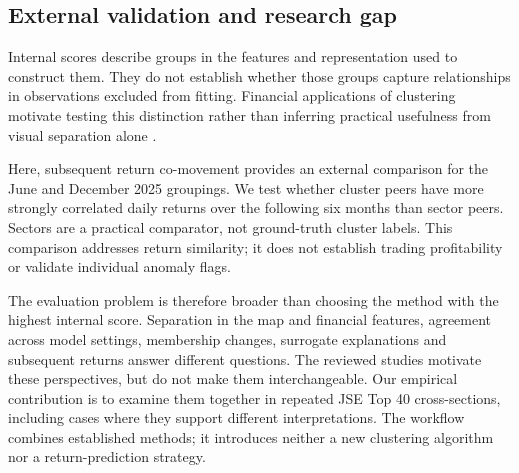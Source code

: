 \subsection{External validation and research gap}

Internal scores describe groups in the features and representation used to construct them. They do not establish whether those groups capture relationships in observations excluded from fitting. Financial applications of clustering motivate testing this distinction rather than inferring practical usefulness from visual separation alone \citep{lim2021,cuomo2022,han2023}.

Here, subsequent return co-movement provides an external comparison for the June and December 2025 groupings. We test whether cluster peers have more strongly correlated daily returns over the following six months than sector peers. Sectors are a practical comparator, not ground-truth cluster labels. This comparison addresses return similarity; it does not establish trading profitability or validate individual anomaly flags.

The evaluation problem is therefore broader than choosing the method with the highest internal score. Separation in the map and financial features, agreement across model settings, membership changes, surrogate explanations and subsequent returns answer different questions. The reviewed studies motivate these perspectives, but do not make them interchangeable. Our empirical contribution is to examine them together in repeated JSE Top 40 cross-sections, including cases where they support different interpretations. The workflow combines established methods; it introduces neither a new clustering algorithm nor a return-prediction strategy.

